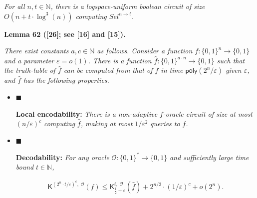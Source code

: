 \documentclass[10pt,a4paper]{article}
\begin{document}
\emph{For all $n,t\in\mathbb{N}$, there is a logspace-uniform boolean circuit of size $O(n+t\cdot\log^{3}(n))$ computing $Sel^{n\to t}$.}\par







\par\medskip\noindent\textbf{
\textbf{Lemma 62}\textbf{ }([26]; see [16] and [15])\textbf{.}
}\par



\emph{There exist constants $a,c\in\mathbb{N}$ as follows. Consider a function $f:\{0,1\}^{n}\to\{0,1\}$ and a parameter $\varepsilon=o(1)$. There is a function $\hat{f}:\{0,1\}^{a\cdot n}\to\{0,1\}$ such that the truth-table of $\hat{f}$ can be computed from that of $f$ in time ${\mathsf{poly}}(2^{n}/\varepsilon)$ given $\varepsilon$, and $\hat{f}$ has the following properties.}\par


\begin{itemize}


\item[] 
$\blacksquare$ 


\textbf{Local encodability:}\emph{ There is a non-adaptive }$f$\emph{-oracle circuit of size at most }$(n/\varepsilon)^{c}$\emph{ computing }$\hat{f}$\emph{, making at most }$1/\varepsilon^{2}$\emph{ queries to }$f$\emph{.}\par





\item[] 
$\blacksquare$ 


\textbf{Decodability:}\emph{ For any oracle }$\mathcal{O}:\{0,1\}^{*}\to\{0,1\}$\emph{ and sufficiently large time bound }$t\in\mathbb{N}$\emph{,}\par


\[\begin{gathered}
{\mathsf{K}}^{(2^{n}\cdot t/\varepsilon)^{c},\;\mathcal{O}}(f)\leq{\mathsf{K}}^{t,\;\mathcal{O}}_{\frac{1}{2}+\varepsilon}(\hat{f})+2^{n/2}\cdot(1/\varepsilon)^{c}+o(2^{n}).
\end{gathered}\]





\end{itemize}
\end{document}
